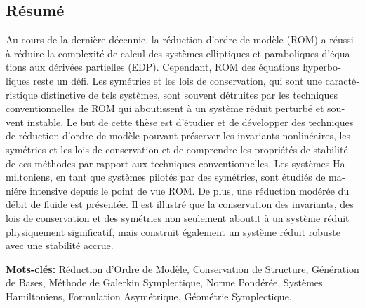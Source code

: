 \begin{otherlanguage}{french}
\cleardoublepage
\chapter*{Résumé}
Au cours de la derni\`ere d\'ecennie, la r\'eduction d'ordre de mod\`ele (ROM) a r\'eussi \`a r\'eduire la complexit\'e de calcul des syst\`emes elliptiques et paraboliques d'\'equations aux d\'eriv\'ees partielles (EDP). Cependant, ROM des \'equations hyperboliques reste un d\'efi. Les sym\'etries et les lois de conservation, qui sont une caract\'eristique distinctive de tels syst\`emes, sont souvent d\'etruites par les techniques conventionnelles de ROM qui aboutissent \`a un syst\`eme r\'eduit perturb\'e et souvent instable. Le but de cette th\`ese est d'\'etudier et de d\'evelopper des techniques de r\'eduction d'ordre de mod\`ele pouvant pr\'eserver les invariants nonlin\'eaires, les sym\'etries et les lois de conservation et de comprendre les propri\'et\'es de stabilit\'e de ces m\'ethodes par rapport aux techniques conventionnelles. Les syst\`emes Hamiltoniens, en tant que syst\`emes pilot\'es par des sym\'etries, sont \'etudi\'es de mani\'ere intensive depuis le point de vue ROM. De plus, une r\'eduction mod\'er\'ee du d\'ebit de fluide est pr\'esent\'ee. Il est illustr\'e que la conservation des invariants, des lois de conservation et des sym\'etries non seulement aboutit \`a un syst\`eme r\'eduit physiquement significatif, mais construit \'egalement un syst\`eme r\'eduit robuste avec une stabilit\'e accrue.
\end{otherlanguage}

\vspace{1cm}

\textbf{Mots-cl\'es:} R\'eduction d'Ordre de Mod\`ele, Conservation de Structure, G\'en\'eration de Bases, M\'ethode de Galerkin Symplectique, Norme Pond\'er\'ee, Syst\`emes Hamiltoniens, Formulation Asym\'etrique, G\'eom\'etrie Symplectique.

